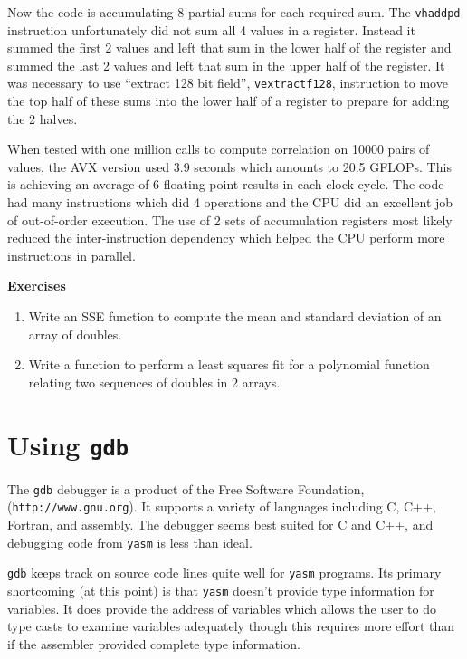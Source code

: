 \documentclass[11pt,b5paper]{book}
\begin{document}
Now the code is accumulating 8 partial sums for each required sum.
The {\tt vhaddpd} instruction unfortunately did not sum all 4 values in
a register.
Instead it summed the first 2 values and left that sum in the lower
half of the register and summed the last 2 values and left that sum
in the upper half of the register.
It was necessary to use ``extract 128 bit field'', {\tt vextractf128},
instruction to move the top half of these sums into the lower half of a
register to prepare for adding the 2 halves.

When tested with one million calls to compute correlation on 10000
pairs of values, the AVX version used 3.9 seconds which amounts to
20.5 GFLOPs.  This is achieving an average of 6 floating point results
in each clock cycle.
The code had many instructions which did 4 operations and the CPU did an
excellent job of out-of-order execution.
The use of 2 sets of accumulation registers most likely reduced the
inter-instruction dependency which helped the CPU perform more instructions
in parallel.

\vfill
\break
{\bf\large Exercises}

\begin{enumerate}
    \item Write an SSE function to compute the mean and standard deviation
    of an array of doubles.
    \item Write a function to perform a least squares fit for a polynomial
    function relating two sequences of doubles in 2 arrays.
\end{enumerate}

\appendix

\chapter{Using {\tt gdb}}

The {\tt gdb} debugger is a product of the Free Software Foundation, ({\tt http://www.gnu.org}).
It supports a variety of languages including C, C++, Fortran, and assembly.
The debugger seems best suited for C and C++, and debugging code from {\tt yasm} is less than ideal.

{\tt gdb} keeps track on source code lines quite well for {\tt yasm} programs.
Its primary shortcoming (at this point) is that {\tt yasm} doesn't provide type information for
variables.
It does provide the address of variables which allows the user to do type casts to examine variables
adequately though this requires more effort than if the assembler provided complete type information.
\end{document}
